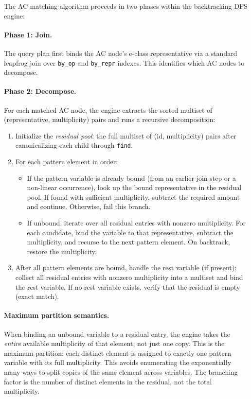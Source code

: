 \documentclass[sigplan,nonacm]{acmart}
\begin{document}
The AC matching algorithm proceeds in two phases within the
backtracking DFS engine:

\paragraph{Phase 1: Join.}  The query plan first binds the AC
node's e-class representative via a standard leapfrog join over
\texttt{by\_op} and \texttt{by\_repr} indexes.  This identifies
which AC nodes to decompose.

\paragraph{Phase 2: Decompose.}  For each matched AC node, the
engine extracts the sorted multiset of (representative, multiplicity)
pairs and runs a recursive decomposition:

\begin{enumerate}
\item Initialize the \emph{residual pool}: the full multiset of
  (id, multiplicity) pairs after canonicalizing each child through
  \texttt{find}.

\item For each pattern element in order:
  \begin{itemize}
  \item If the pattern variable is already bound (from an earlier
    join step or a non-linear occurrence), look up the bound
    representative in the residual pool.  If found with sufficient
    multiplicity, subtract the required amount and continue.
    Otherwise, fail this branch.
  \item If unbound, iterate over all residual entries with nonzero
    multiplicity.  For each candidate, bind the variable to that
    representative, subtract the multiplicity, and recurse to the
    next pattern element.  On backtrack, restore the multiplicity.
  \end{itemize}

\item After all pattern elements are bound, handle the rest variable
  (if present): collect all residual entries with nonzero multiplicity
  into a multiset and bind the rest variable.  If no rest variable
  exists, verify that the residual is empty (exact match).
\end{enumerate}

\paragraph{Maximum partition semantics.}  When binding an unbound
variable to a residual entry, the engine takes the \emph{entire}
available multiplicity of that element, not just one copy.
This is the maximum partition: each distinct element is assigned to
exactly one pattern variable with its full multiplicity.  This avoids
enumerating the exponentially many ways to split copies of the same
element across variables.  The branching factor is the number of
distinct elements in the residual, not the total multiplicity.
\end{document}
